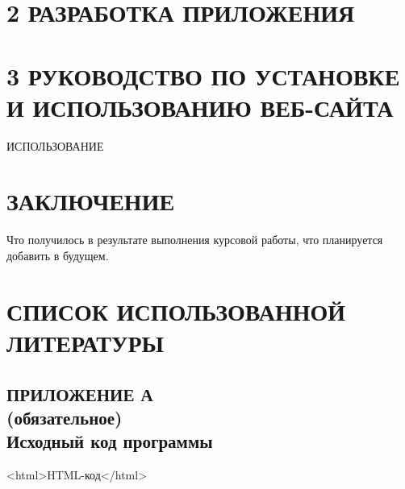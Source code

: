 \documentclass[14pt,a4paper]{extreport}
\begin{document}
	\section*{\normalsize\hspace{4ex}2 РАЗРАБОТКА ПРИЛОЖЕНИЯ}
	\newpage
	\section*{\normalsize\hspace{4ex}3 РУКОВОДСТВО ПО УСТАНОВКЕ И ИСПОЛЬЗОВАНИЮ ВЕБ-САЙТА}
	\hspace{4ex}ИСПОЛЬЗОВАНИЕ
	\newpage
	\section*{\center\normalsize ЗАКЛЮЧЕНИЕ \endcenter}
	\hspace{4ex}Что получилось в результате выполнения курсовой работы, что планируется добавить в будущем.
	\newpage
	\section*{\center\normalsize СПИСОК ИСПОЛЬЗОВАННОЙ ЛИТЕРАТУРЫ \endcenter}
	\begin{landscape}
	\newpage
	\section*{\center\normalsize ПРИЛОЖЕНИЕ А\\(обязательное)\\Исходный код программы \endcenter}
	<html>HTML-код</html>
	\end{landscape}
	
	
\end{document}
